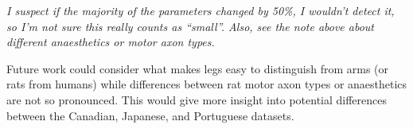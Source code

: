 \documentclass[12pt]{article}
\begin{document}
\emph{I suspect if the majority of the parameters changed by 50\%, I wouldn't detect it, so I'm not sure this really counts as ``small''. Also, see the note above about different anaesthetics or motor axon types.}

Future work could consider what makes legs easy to distinguish from arms (or rats from humans) while differences between rat motor axon types or anaesthetics are not so pronounced. This would give more insight into potential differences between the Canadian, Japanese, and Portuguese datasets.
\end{document}
